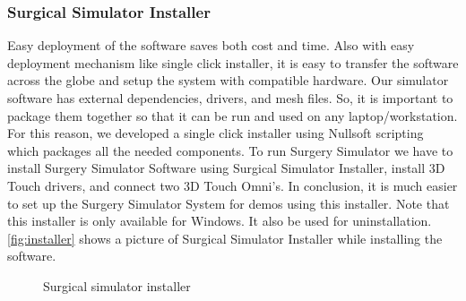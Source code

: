 \subsubsection{Surgical Simulator Installer}\label{sec:installer}
Easy deployment of the software saves both cost and time. Also with easy deployment mechanism like single click installer, it is easy to transfer the software across the globe and setup the system with compatible hardware. Our simulator software has external dependencies, drivers, and  mesh files. So, it is important to package them together so that it can be run and used on any laptop/workstation. For this reason, we developed a single click installer using Nullsoft scripting which packages all the needed components. To run Surgery Simulator we have to install Surgery Simulator Software using Surgical Simulator Installer, install 3D Touch drivers, and connect two 3D Touch Omni's. In conclusion, it is much easier to set up the Surgery Simulator System for demos using this installer. Note that this installer is only available for Windows. It also be used for uninstallation. \autoref{fig:installer} shows a picture of Surgical Simulator Installer while installing the software.

\begin{figure}
  \centering
  \qquad
  \caption{Surgical simulator installer}\label{fig:installer}
\end{figure}

\clearpage%
